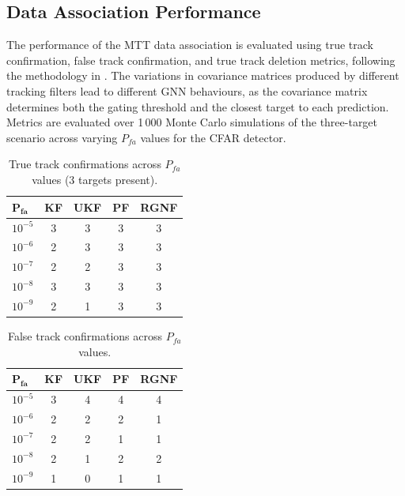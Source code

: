 \documentclass[conference]{IEEEtran}
\begin{document}
\subsection{Data Association Performance}

The performance of the MTT data association is evaluated using true track confirmation, false track confirmation, and true track deletion metrics, following the methodology in \cite{kennedy2014powerful}. The variations in covariance matrices produced by different tracking filters lead to different GNN behaviours, as the covariance matrix determines both the gating threshold and the closest target to each prediction. Metrics are evaluated over 1\,000 Monte Carlo simulations of the three-target scenario across varying $P_{fa}$ values for the CFAR detector.

\begin{table}[H]
    \centering
    \caption{True track confirmations across $P_{fa}$ values (3 targets present).}
    \label{tab:Ptt}
    \setlength{\tabcolsep}{3.5pt}
    \begin{tabular}{@{}lcccc@{}}
        \toprule
        $\mathbf{P_{fa}}$ & \textbf{KF} & \textbf{UKF} & \textbf{PF} & \textbf{RGNF} \\
        \midrule
        $10^{-5}$ & \cellcolor{green!20}3 & \cellcolor{green!20}3 & \cellcolor{green!20}3 & \cellcolor{green!20}3 \\
        $10^{-6}$ & 2 & \cellcolor{green!20}3 & \cellcolor{green!20}3 & \cellcolor{green!20}3 \\
        $10^{-7}$ & 2 & 2 & \cellcolor{green!20}3 & \cellcolor{green!20}3 \\
        $10^{-8}$ & \cellcolor{green!20}3 & \cellcolor{green!20}3 & \cellcolor{green!20}3 & \cellcolor{green!20}3 \\
        $10^{-9}$ & 2 & \cellcolor{red!20}1 & \cellcolor{green!20}3 & \cellcolor{green!20}3 \\
        \bottomrule
    \end{tabular}
\end{table}

\begin{table}[H]
    \centering
    \caption{False track confirmations across $P_{fa}$ values.}
    \label{tab:Pft}
    \setlength{\tabcolsep}{3.5pt}
    \begin{tabular}{@{}lcccc@{}}
        \toprule
        $\mathbf{P_{fa}}$ & \textbf{KF} & \textbf{UKF} & \textbf{PF} & \textbf{RGNF} \\
        \midrule
        $10^{-5}$ & 3 & \cellcolor{red!20}4 & \cellcolor{red!20}4 & \cellcolor{red!20}4 \\
        $10^{-6}$ & 2 & 2 & 2 & 1 \\
        $10^{-7}$ & 2 & 2 & 1 & 1 \\
        $10^{-8}$ & 2 & 1 & 2 & 2 \\
        $10^{-9}$ & 1 & \cellcolor{green!20}0 & 1 & 1 \\
        \bottomrule
    \end{tabular}
\end{table}
\end{document}
